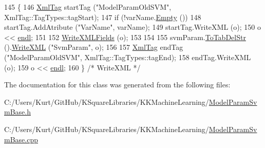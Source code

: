 \begin{DoxyCode}
145 \{
146   \hyperlink{class_k_k_b_1_1_xml_tag}{XmlTag}  startTag (\textcolor{stringliteral}{"ModelParamOldSVM"},  XmlTag::TagTypes::tagStart);
147   \textcolor{keywordflow}{if}  (!varName.\hyperlink{class_k_k_b_1_1_k_k_str_ac69942f73fffd672ec2a6e1c410afdb6}{Empty} ())
148     startTag.AddAtribute (\textcolor{stringliteral}{"VarName"}, varName);
149   startTag.WriteXML (o);
150   o << \hyperlink{namespace_k_k_b_ad1f50f65af6adc8fa9e6f62d007818a8}{endl};
151 
152   \hyperlink{class_k_k_m_l_l_1_1_model_param_a91dc06ec604cf9c2a045991e9b88b5d3}{WriteXMLFields} (o);
153 
154 
155   svmParam.\hyperlink{struct_s_v_m289___m_f_s_1_1svm__parameter_ad3699cafbed5bd49a345b4be3ffe65a8}{ToTabDelStr} ().\hyperlink{class_k_k_b_1_1_k_k_str_a7de8ac49f70cdcdf2cc31786d23b8a62}{WriteXML} (\textcolor{stringliteral}{"SvmParam"}, o);
156 
157   \hyperlink{class_k_k_b_1_1_xml_tag}{XmlTag}  endTag (\textcolor{stringliteral}{"ModelParamOldSVM"}, XmlTag::TagTypes::tagEnd);
158   endTag.WriteXML (o);
159   o << \hyperlink{namespace_k_k_b_ad1f50f65af6adc8fa9e6f62d007818a8}{endl};
160 \}  \textcolor{comment}{/* WriteXML */}
\end{DoxyCode}


The documentation for this class was generated from the following files\+:\begin{DoxyCompactItemize}
\item 
C\+:/\+Users/\+Kurt/\+Git\+Hub/\+K\+Square\+Libraries/\+K\+K\+Machine\+Learning/\hyperlink{_model_param_svm_base_8h}{Model\+Param\+Svm\+Base.\+h}\item 
C\+:/\+Users/\+Kurt/\+Git\+Hub/\+K\+Square\+Libraries/\+K\+K\+Machine\+Learning/\hyperlink{_model_param_svm_base_8cpp}{Model\+Param\+Svm\+Base.\+cpp}\end{DoxyCompactItemize}
